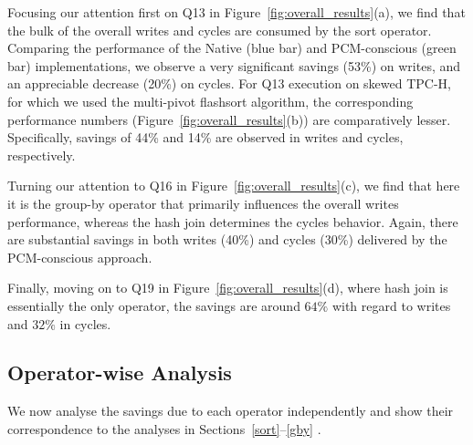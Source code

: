 \begin{figure*}[htpb]

\centering

\hspace{0mm}
\hspace{0mm}
\hspace{0mm}
\caption{Performance of TPC-H queries}
\label{fig:overall_results}
\end{figure*}


Focusing our attention first on Q13 in
Figure~\ref{fig:overall_results}(a), we find that the bulk of the
overall writes and cycles are consumed by the sort operator. Comparing
the performance of the Native (blue bar) and PCM-conscious (green bar)
implementations, we observe a very significant savings (53\%) on writes,
and an appreciable decrease (20\%) on cycles. For Q13 execution on skewed 
TPC-H, for which we used the multi-pivot flashsort algorithm, 
the corresponding performance numbers (Figure~\ref{fig:overall_results}(b)) are
comparatively lesser. Specifically, savings of 
44\% and 14\%  are observed in writes and cycles, respectively.

Turning our attention to Q16 in Figure~\ref{fig:overall_results}(c),
we find that here it is the group-by operator that primarily influences
the overall writes performance, whereas the hash join determines the
cycles behavior. Again, there are substantial savings in both writes
(40\%) and  cycles (30\%) delivered by the PCM-conscious approach.

Finally, moving on to Q19 in Figure~\ref{fig:overall_results}(d),
where hash join is essentially the only operator, the
savings are around $64\%$ with regard to writes and $32\%$ in cycles.

\subsection{Operator-wise Analysis}
We now analyse the savings due to each operator independently and show
their correspondence to the analyses in Sections~\ref{sort}--\ref{gby} .

